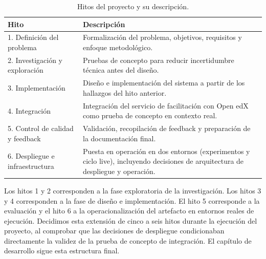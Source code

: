 \begin{table}[h]
\centering
\begin{tabular}{lp{9cm}}
\toprule
\textbf{Hito} & \textbf{Descripción} \\
\midrule
1. Definición del problema & Formalización del problema, objetivos, requisitos y enfoque metodológico. \\
2. Investigación y exploración & Pruebas de concepto para reducir incertidumbre técnica antes del diseño. \\
3. Implementación & Diseño e implementación del sistema a partir de los hallazgos del hito anterior. \\
4. Integración & Integración del servicio de facilitación con Open edX como prueba de concepto en contexto real. \\
5. Control de calidad y feedback & Validación, recopilación de feedback y preparación de la documentación final. \\
6. Despliegue e infraestructura & Puesta en operación en dos entornos (experimentos y ciclo live), incluyendo decisiones de arquitectura de despliegue y operación. \\
\bottomrule
\end{tabular}
\caption{Hitos del proyecto y su descripción.}
\label{tab:milestones}
\end{table}

Los hitos 1 y 2 corresponden a la fase exploratoria de la investigación. Los hitos 3 y 4 corresponden a la fase de diseño e implementación. El hito 5 corresponde a la evaluación y el hito 6 a la operacionalización del artefacto en entornos reales de ejecución. Decidimos esta extensión de cinco a seis hitos durante la ejecución del proyecto, al comprobar que las decisiones de despliegue condicionaban directamente la validez de la prueba de concepto de integración. El capítulo de desarrollo sigue esta estructura final.
